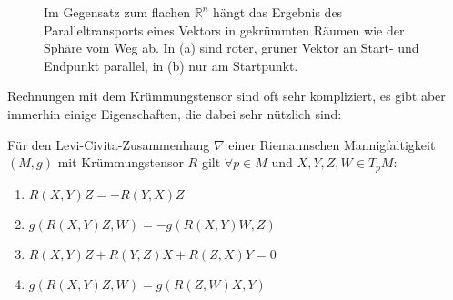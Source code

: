 \documentclass[../H_Analysis_main.tex]{subfiles}
\begin{document}
\iffalse
\begin{figure}
\centering

\subfloat[Parallelogram im $\mathbb{R}^2$]{\texttt{[image: Bilder/parallelogram\_geschlossen.pdf]}}
\subfloat[Parallelogram auf der 2-Sphäre]{\texttt{[image: Bilder/parallelogram\_ungeschlossen.pdf]}}

\caption[Parallelogramme]{Im Gegensatz zum flachen $\mathbb{R}^n$ ist es in gekrümmten Räumen ist es nicht mehr so, dass sich Parallelogramme gleicher Vektoren schließen.}
\label{fig:parallelograme}
\end{figure}
\fi


\begin{figure}
\centering

\hspace{0.06\textwidth}%

\caption[Paralleltransport]{Im Gegensatz zum flachen $\mathbb{R}^n$ hängt das Ergebnis des Paralleltransports eines Vektors in gekrümmten Räumen wie der Sphäre vom Weg ab. In (a) sind roter, grüner Vektor an Start- und Endpunkt parallel, in (b) nur am Startpunkt.}
\label{fig:paralleltransport}
\end{figure}


Rechnungen mit dem Krümmungstensor sind oft sehr kompliziert, es gibt aber immerhin einige Eigenschaften, die dabei sehr nützlich sind:

\begin{satz}
Für den Levi-Civita-Zusammenhang $\nabla$ einer Riemannschen Mannigfaltigkeit $(M, g)$ mit Krümmungstensor $R$ gilt $\forall p \in M$ und $X, Y, Z, W \in T_p M$:
\begin{enumerate}
\item $R(X, Y) Z = - R(Y, X) Z$

\item $g(R(X, Y) Z, W) = - g(R(X, Y) W, Z)$

\item $R(X, Y) Z + R(Y, Z) X + R(Z, X) Y = 0$

\item $g(R(X, Y) Z, W) = g(R(Z, W) X, Y)$
\end{enumerate}
\end{satz}
\end{document}
